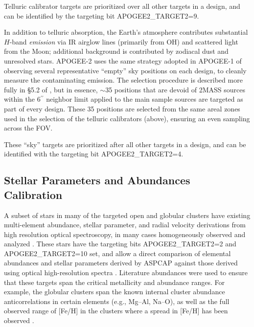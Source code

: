 \documentclass[12pt,twocolumn]{emulateapj}
\begin{document}
Telluric calibrator targets are prioritized over all other targets in a design, and can be identified by the targeting bit APOGEE2\_TARGET2=9.

In addition to telluric absorption, the Earth's atmosphere contributes substantial $H$-band {\it emission} via IR airglow lines (primarily from OH) and scattered light from the Moon; additional background is contributed by zodiacal dust and unresolved stars.  APOGEE-2 uses the same strategy adopted in APOGEE-1 of observing several representative ``empty'' sky positions on each design, to cleanly measure the contaminating emission.  The selection procedure is described more fully in \S5.2 of \citet{Zasowski_2013_apogeetargeting}, but in essence, $\sim$35 positions that are devoid of 2MASS sources within the 6$^{\prime\prime}$ neighbor limit applied to the main sample sources are targeted as part of every design.  These 35 positions are selected from the same areal zones used in the selection of the telluric calibrators (above), ensuring an even sampling across the FOV.

These ``sky'' targets are prioritized after all other targets in a design, and can be identified with the targeting bit APOGEE2\_TARGET2=4.

\subsection{Stellar Parameters and Abundances Calibration}
\label{sec:calibration_params}

A subset of stars in many of the targeted open and globular clusters have existing multi-element abundance, stellar parameter, and radial velocity derivations from high resolution optical spectroscopy, in many cases homogeneously observed and analyzed \citep[e.g.,][]{carrettauves,carrettagiraffe}.  These stars have the targeting bits APOGEE2\_TARGET2=2 and APOGEE2\_TARGET2=10 set, and allow a direct comparison of elemental abundances and stellar parameters derived by ASPCAP against those derived using optical high-resolution spectra \citep[e.g.,][]{Meszaros_2013_aspcapcalib,Holtzman_2015_apogeedata}.  Literature abundances were used to ensure that these targets span the critical metallicity and abundance ranges.  For example, the globular clusters span the known internal cluster abundance anticorrelations in certain elements (e.g., Mg--Al, Na--O), as well as the full observed range of [Fe/H] in the clusters where a spread in [Fe/H] has been observed \citep[e.g.,][]{m22_iron,omegacen_sandro}.     
\end{document}
